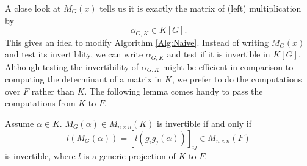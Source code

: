 \documentclass[sigconf]{acmart}
\newcommand{\osum}[2]{\alpha_{#1,#2}}
\theoremstyle{acmplain}
\begin{document}
 A close look at $M_G(x)$ tells us it is exactly the matrix of (left) multiplication by $$\osum{G}{K} \in K[G].$$  This gives an idea to modify Algorithm \ref{Alg:Naive}. Instead of writing $M_G(x)$ and test its  invertiblity, 
 we can write $\osum{G}{K}$ and test if it is invertible in $K[G]$. Although testing the invertibility of $\osum{G}{K}$ might be efficient in
 comparison to computing the determinant of a matrix in $K$, we prefer to do the computations over $F$ rather than $K$. The  following lemma
 comes handy to pass the computations from $K$ to $F$.


\begin{lemma}\label{Lem:Proj}
Assume $\alpha \in K$. $M_G(\alpha) \in M_{n \times n}(K)$ 
is invertible if and only if $$l(M_G(\alpha)) =  [l(g_ig_j(\alpha))]_{ij}  \in M_{n \times n}(F)$$ is invertible,
 where $l$ is a generic projection of $K$ to $F$.
\end{lemma}
\end{document}
